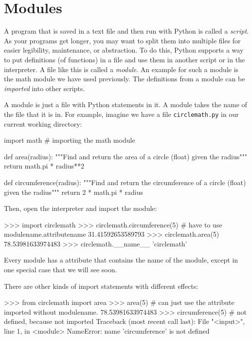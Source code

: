 \documentclass[11pt]{cselabheader}
\begin{document}
{\begin{itemize}
\end{itemize}

\pagebreak
\section{Modules}
\label{sec:modules}

A program that is saved in a text file and then run with Python is called a
\emph{script}. As your programs get longer, you may want to split them into
multiple files for easier legibility, maintenance, or abstraction. To do this,
Python supports a way to put definitions (of functions) in a file and use them
in another script or in the interpreter. A file like this is called a
\emph{module}. An example for such a module is the math module we have used
previously. The definitions from a module can be \emph{imported} into other
scripts.

A module is just a file with Python statements in it. A module takes the name of
the file that it is in. For example, imagine we have a file
\texttt{circlemath.py} in our current working directory:

\begin{python3code}
import math # importing the math module

def area(radius):
    """Find and return the area of a circle (float) given the radius"""
    return math.pi * radius**2

def circumference(radius):
    """Find and return the circumference of a circle (float) given the radius"""
    return 2 * math.pi * radius
\end{python3code}

Then, open the interpreter and import the module:

\begin{pyconcode}
>>> import circlemath
>>> circlemath.circumference(5) # have to use modulename.attributename
31.41592653589793
>>> circlemath.area(5)
78.53981633974483
>>> circlemath.__name__
'circlemath'
\end{pyconcode}

Every module has a  attribute that contains the name of
the module, except in one special case that we will see soon.

There are other kinds of import statements with different effects:

\begin{pyconcode}
>>> from circlemath import area
>>> area(5) # can just use the attribute imported without modulename.
78.53981633974483
>>> circumference(5) # not defined, because not imported
Traceback (most recent call last):
  File "<input>", line 1, in <module>
NameError: name 'circumference' is not defined
\end{pyconcode}

}
\end{document}
